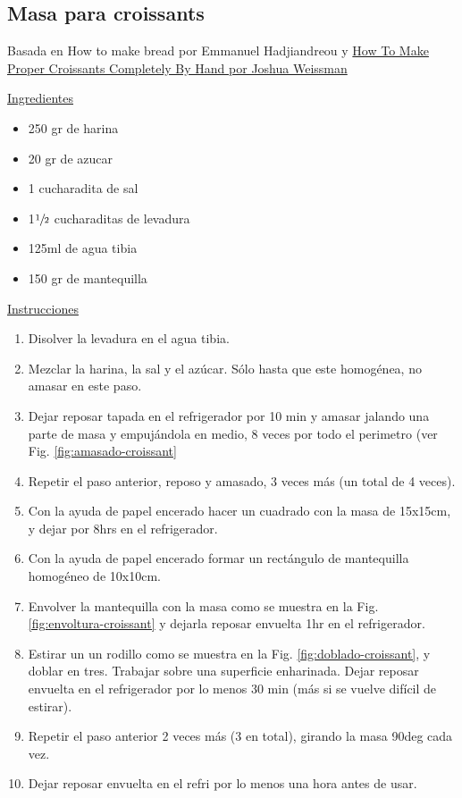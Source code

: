 \subsection{Masa para croissants}
\label{sec:masa-para-croissants}

Basada en How to make bread por Emmanuel Hadjiandreou y \href{https://www.youtube.com/watch?v=hJxaVD6eAtc}{How To Make Proper Croissants Completely By Hand por Joshua Weissman}

\underline{Ingredientes}

\begin{itemize}
\item 250 gr de harina
\item 20 gr de azucar
\item 1 cucharadita de sal
\item 1$\sfrac{1}{2}$ cucharaditas de levadura
\item 125ml de agua tibia
\item 150 gr de mantequilla
\end{itemize}

\underline{Instrucciones}

\begin{enumerate}
\item Disolver la levadura en el agua tibia.
\item Mezclar la harina, la sal y el azúcar. Sólo hasta que este homogénea, no amasar en este paso.
\item Dejar reposar tapada en el refrigerador por 10 min y amasar jalando una parte de masa y empujándola en medio, 8 veces por todo el perimetro (ver Fig. \ref{fig:amasado-croissant}
\item Repetir el paso anterior, reposo y amasado, 3 veces más (un total de 4 veces).
\item Con la ayuda de papel encerado hacer un cuadrado con la masa de \Sim 15x15cm, y dejar por \Sim 8hrs en el refrigerador.
\item Con la ayuda de papel encerado formar un rectángulo de mantequilla homogéneo de \Sim 10x10cm.
\item Envolver la mantequilla con la masa como se muestra en la Fig. \ref{fig:envoltura-croissant} y dejarla reposar envuelta 1hr en el refrigerador.
\item Estirar un un rodillo como se muestra en la Fig. \ref{fig:doblado-croissant}, y doblar en tres. Trabajar sobre una superficie enharinada. Dejar reposar envuelta en el refrigerador por lo menos 30 min (más si se vuelve difícil de estirar).
\item Repetir el paso anterior 2 veces más (3 en total), girando la masa 90deg cada vez.
\item Dejar reposar envuelta en el refri por lo menos una hora antes de usar. 
\end{enumerate}


